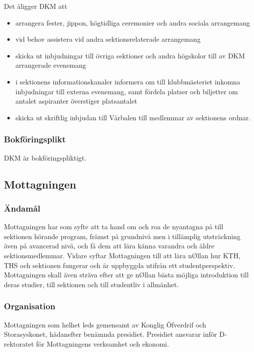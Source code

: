 \documentclass{dgovdoc}
\begin{document}
Det åligger DKM att

\begin{itemize}
  \item arrangera fester, jippon, högtidliga ceremonier och andra sociala
    arrangemang
  \item vid behov assistera vid andra sektionsrelaterade arrangemang
  \item skicka ut inbjudningar till övriga sektioner och andra högskolor till
    av DKM arrangerade evenemang
  \item i sektionens informationskanaler informera om till klubbmästeriet
    inkomna inbjudningar till externa evenemang, samt fördela platser och
    biljetter om antalet aspiranter överstiger platsantalet
  \item skicka ut skriftlig inbjudan till Vårbalen till medlemmar av sektionens
    ordnar.
\end{itemize}

\subsubsection{Bokföringsplikt}

DKM är bokföringspliktigt.

\subsection{Mottagningen}

\subsubsection{Ändamål}

Mottagningen har som syfte att ta hand om och roa de nyantagna på till
sektionen hörande program, främst på grundnivå men i tillämplig utsträckning
även på avancerad nivå, och få dem att lära känna varandra och äldre
sektionsmedlemmar. Vidare syftar Mottagningen till att lära nØllan hur KTH, THS
och sektionen fungerar och är uppbyggda utifrån ett studentperspektiv.
Mottagningen skall även sträva efter att ge nØllan bästa möjliga introduktion
till deras studier, till sektionen och till studentliv i allmänhet.

\subsubsection{Organisation}

Mottagningen som helhet leds gemensamt av Konglig Öfverdrif och Storasyskonet,
hädanefter benämnda presidiet. Presidiet ansvarar inför D-rektoratet för
Mottagningens verksamhet och ekonomi.
\end{document}
